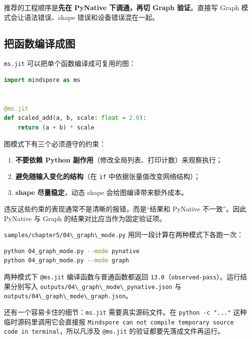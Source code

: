 推荐的工程顺序是\textbf{先在 PyNative 下调通，再切 Graph 验证}。直接写
Graph 模式会让语法错误、shape 错误和设备错误混在一起。

\subsection{把函数编译成图}\label{src-book-chapter5-h18}

\passthrough{\lstinline!ms.jit!} 可以把单个函数编译成可复用的图：

\begin{lstlisting}[language=Python]
import mindspore as ms


@ms.jit
def scaled_add(a, b, scale: float = 2.0):
    return (a + b) * scale
\end{lstlisting}

图模式下有三个必须遵守的约束：

\begin{enumerate}
\def\labelenumi{\arabic{enumi}.}
\tightlist
\item
  \textbf{不要依赖 Python 副作用}（修改全局列表、打印计数）来观察执行；
\item
  \textbf{避免随输入变化的结构}（在 \passthrough{\lstinline!if!}
  中依据张量值改变网络结构）；
\item
  \textbf{shape 尽量稳定}，动态 shape 会给图编译带来额外成本。
\end{enumerate}

违反这些约束的表现通常不是清晰的报错，而是``结果和 PyNative
不一致''。因此 PyNative 与 Graph 的结果对比应当作为固定验证项。

\passthrough{\lstinline!samples/chapter5/04\_graph\_mode.py!}
用同一段计算在两种模式下各跑一次：

\begin{lstlisting}[language=bash]
python 04_graph_mode.py --mode pynative
python 04_graph_mode.py --mode graph
\end{lstlisting}

两种模式下 \passthrough{\lstinline!@ms.jit!} 编译函数与普通函数都返回
\passthrough{\lstinline!13.0!}（\passthrough{\lstinline!observed-pass!}）。运行结果分别写入
\passthrough{\lstinline!outputs/04\_graph\_mode\_pynative.json!} 与
\passthrough{\lstinline!outputs/04\_graph\_mode\_graph.json!}。

还有一个容易卡住的细节：\passthrough{\lstinline!ms.jit!}
需要真实源码文件。在 \passthrough{\lstinline!python -c "..."!}
这种临时源码里调用它会直接报
\passthrough{\lstinline!Mindspore can not compile temporary source code in terminal!}，所以凡涉及
\passthrough{\lstinline!@ms.jit!} 的验证都要先落成文件再运行。

